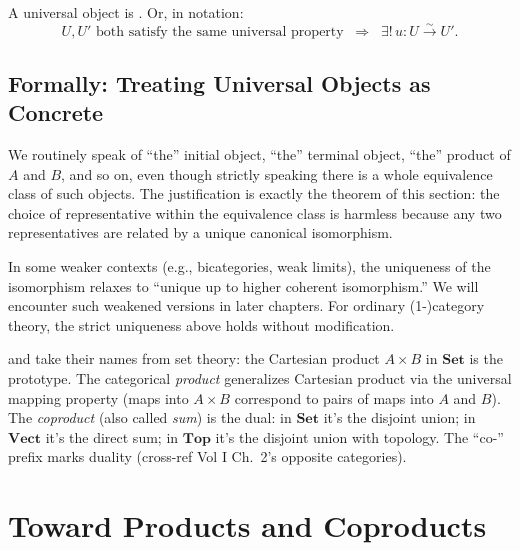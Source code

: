 A universal object is . Or, in
notation:
\begin{equation*}
  U, U' \text{ both satisfy the same universal property}
  \;\;\Longrightarrow\;\;
  \exists !\, u : U \xrightarrow{\sim} U'.
\end{equation*}

\subsection{Formally: Treating Universal Objects as Concrete}

We routinely speak of ``the'' initial object, ``the'' terminal object,
``the'' product of $A$ and $B$, and so on, even though strictly speaking
there is a whole equivalence class of such objects. The justification is
exactly the theorem of this section: the choice of representative within
the equivalence class is harmless because any two representatives are
related by a unique canonical isomorphism.

In some weaker contexts (e.g., bicategories, weak limits), the uniqueness
of the isomorphism relaxes to ``unique up to higher coherent
isomorphism.'' We will encounter such weakened versions in later chapters.
For ordinary (1-)category theory, the strict uniqueness above holds without
modification.


\begin{nameorigin}
 and  take their names from set theory:
the Cartesian product $A \times B$ in $\mathbf{Set}$ is the prototype.
The categorical \emph{product} generalizes Cartesian product via the
universal mapping property (maps into $A \times B$ correspond to pairs
of maps into $A$ and $B$). The \emph{coproduct} (also called \emph{sum})
is the dual: in $\mathbf{Set}$ it's the disjoint union; in $\mathbf{Vect}$
it's the direct sum; in $\mathbf{Top}$ it's the disjoint union with
topology. The ``co-'' prefix marks duality (cross-ref Vol I Ch.~2's
opposite categories).
\end{nameorigin}

\section{Toward Products and Coproducts}
\label{sec:toward-products}

